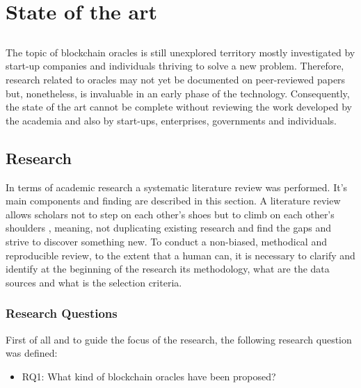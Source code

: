 \chapter{State of the art} \label{chap:sota}

\section*{}



The topic of blockchain oracles is still unexplored territory mostly investigated by start-up companies and individuals thriving to solve a new problem. Therefore, research related to oracles may not yet be documented on peer-reviewed papers but, nonetheless, is invaluable in an early phase of the technology. Consequently, the state of the art cannot be complete without reviewing the work developed by the academia and also by start-ups, enterprises, governments and individuals. 

\section{Research}
 
In terms of academic research a systematic literature review was performed. It's main components and finding are described in this section. 
A literature review allows scholars not to step on each other's shoes but to climb on each other's shoulders \cite{Kitchenham2007GuidelinesEngineering}, meaning, not duplicating existing research and find the gaps and strive to discover something new. To conduct a non-biased, methodical and reproducible review, to the extent that a human can, it is necessary to clarify and identify at the beginning of the research its methodology, what are the data sources and what is the selection criteria.   

\subsection{Research Questions}
First of all and to guide the focus of the research, the following research question was defined:
\begin{itemize}
\item RQ1: What kind of blockchain oracles have been proposed?
\end{itemize}


